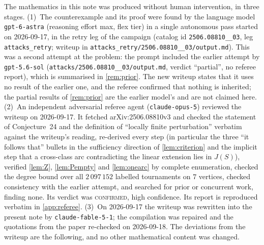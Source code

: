 \documentclass[11pt,a4paper]{article}
\theoremstyle{plain}
\theoremstyle{definition}
\theoremstyle{remark}
\begin{document}
The mathematics in this note was produced without human intervention, in three stages.
(1)~The counterexample and its proof were found by the language model \texttt{gpt-6-astra} (reasoning effort max, flex tier) in a single autonomous pass started on 2026-09-17, in the retry leg of the campaign (catalog id \texttt{2506.08810\_\_03}, leg \texttt{attacks\_retry}; writeup in \texttt{attacks\_retry/2506.08810\_\_03/output.md}). This was a second attempt at the problem: the prompt included the earlier attempt by \texttt{gpt-5.6-sol} (\texttt{attacks/2506.08810\_\_03/output.md}, verdict ``partial'', no referee report), which is summarised in \cref{rem:prior}. The new writeup states that it uses no result of the earlier one, and the referee confirmed that nothing is inherited; the partial results of \cref{rem:prior} are the earlier model's and are not claimed here.
(2)~An independent adversarial referee agent (\texttt{claude-opus-5}) reviewed the writeup on 2026-09-17. It fetched arXiv:2506.08810v3 and checked the statement of Conjecture~24 and the definition of ``locally finite perturbation'' verbatim against the writeup's reading, re-derived every step (in particular the three ``it follows that'' bullets in the sufficiency direction of \cref{lem:criterion} and the implicit step that a cross-class arc contradicting the linear extension lies in $J(S)$), verified \cref{lem:Z}, \cref{lem:Pempty} and \cref{lem:onearc} by complete enumeration, checked the degree bound over all $2\,097\,152$ labelled tournaments on $7$ vertices, checked consistency with the earlier attempt, and searched for prior or concurrent work, finding none. Its verdict was \textsc{confirmed}, high confidence. Its report is reproduced verbatim in \cref{app:referee}.
(3)~On 2026-09-17 the writeup was rewritten into the present note by \texttt{claude-fable-5-1}; the compilation was repaired and the quotations from the paper re-checked on 2026-09-18. The deviations from the writeup are the following, and no other mathematical content was changed.
\end{document}
